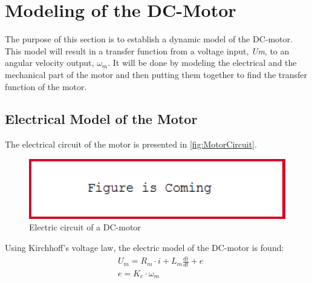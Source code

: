 \section{Modeling of the DC-Motor}

The purpose of this section is to establish a dynamic model of the DC-motor. This model will result in a transfer function from a voltage input, \textit{Um}, to an angular velocity output, \textit{$\omega_m$}. It will be done by modeling the electrical and the mechanical part of the motor and then putting them together to find the transfer function of the motor.

\subsection*{Electrical Model of the Motor}
The electrical circuit of the motor is presented in \autoref{fig:MotorCircuit}.

\begin{figure}[htbp]
	\centering
 	\includegraphics[width=1\textwidth]{figures/FigureIsComing.PNG} 
 	\caption{Electric circuit of a DC-motor}
 	\label{fig:MotorCircuit}
\end{figure}

Using Kirchhoff's voltage law, the electric model of the DC-motor is found:
\begin{subequations} \label{eq:tech_ToA}
	\begin{flalign}
		&U_m = R_m \cdot i + L_m \frac{di}{dt} + e \\
		&e = K_e \cdot \omega_m 
	\end{flalign}
\end{subequations}

\startexplain
\stopexplain


